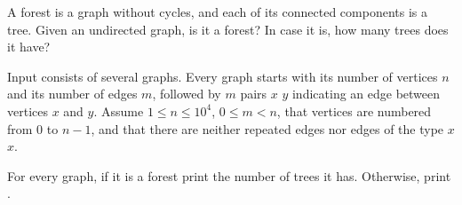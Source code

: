 

\Statement

A forest is a graph without cycles, and each of its connected components is
a tree. Given an undirected graph, is it a forest? In case it is, how
many trees does it have?


\Input

Input consists of several graphs.
Every graph starts with its number of vertices $n$ and its number of edges $m$,
followed by $m$ pairs $x$ $y$ indicating an edge between vertices $x$ and $y$.
Assume $1 \le n \le 10^4$, $0 \le m < n$,
that vertices are numbered from $0$ to $n-1$,
and that there are neither repeated edges nor edges of the type $x$ $x$.


\Output

For every graph, if it is a forest print the number of trees it has.
Otherwise, print .


\SampleOneCol

